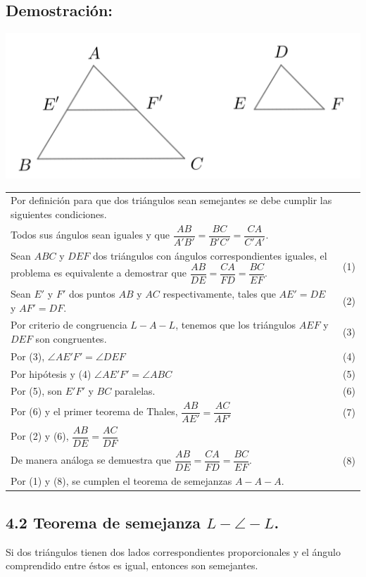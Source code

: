 \documentclass[12pt,a4paper]{article}
\begin{document}
\subsection*{Demostración:}
\begin{center}
\includegraphics[scale=0.8]{Imagenes/semejanza.png} 
\end{center}
\begin{tabular}{p{15.9 cm} p{1cm}}
Por definición para que dos triángulos sean semejantes se debe cumplir las siguientes condiciones.
\\Todos sus ángulos sean iguales y que $\dfrac{AB}{A'B'}=\dfrac{BC}{B'C'}=\dfrac{CA}{C'A'}.$ 
\\Sean $ABC$ y $DEF$ dos triángulos con ángulos correspondientes iguales, el problema es equivalente a demostrar que $\dfrac{AB}{DE}=\dfrac{CA}{FD}=\dfrac{BC}{EF}.$&\medskip (1)
\\Sean $E'$ y $F'$ dos puntos $AB$ y $AC$ respectivamente, tales que $AE'= DE$ y $AF' = DF$. &(2)
\\Por criterio de congruencia $L-A-L$, tenemos que los triángulos $AEF$ y $DEF$ son congruentes.&(3)
\\Por (3), $\angle AE'F' = \angle DEF $ & (4)
\\Por hipótesis y (4) $\angle AE'F'=\angle ABC$ & (5)
\\Por (5), son $E'F'$ y $BC$ paralelas. & (6)
\\Por (6) y el primer teorema de Thales, $\dfrac{AB}{AE'}=\dfrac{AC}{AF'}$ & (7)
\\Por (2) y (6), $\dfrac{AB}{DE}=\dfrac{AC}{DF}$
\\De manera análoga se demuestra que $\dfrac{AB}{DE}=\dfrac{CA}{FD}=\dfrac{BC}{EF}.$ & (8)
\\Por (1) y (8), se cumplen el teorema de semejanzas $A-A-A$.
\end{tabular}
\subsection*{4.2 Teorema de semejanza $L- \angle -L$.}
Si dos triángulos tienen dos lados correspondientes proporcionales y el ángulo comprendido entre éstos es igual, entonces son semejantes.
\end{document}

